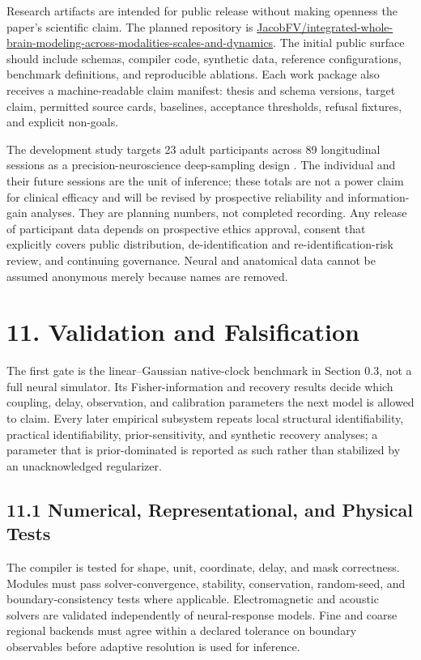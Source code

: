 Research artifacts are intended for public release without making openness
the paper's scientific claim. The planned repository is
\href{https://github.com/JacobFV/integrated-whole-brain-modeling-across-modalities-scales-and-dynamics}{JacobFV/integrated-whole-brain-modeling-across-modalities-scales-and-dynamics}.
The initial public surface should include schemas, compiler code, synthetic
data, reference configurations, benchmark definitions, and reproducible
ablations. Each work package also receives a machine-readable claim manifest:
thesis and schema versions, target claim, permitted source cards, baselines,
acceptance thresholds, refusal fixtures, and explicit non-goals.

The development study targets 23 adult participants across 89 longitudinal
sessions as a precision-neuroscience deep-sampling design
\citep{poldrack2015myconnectome,gordon2017msc}. The individual and their
future sessions are the unit of inference; these totals are not a power claim
for clinical efficacy and will be revised by prospective reliability and
information-gain analyses. They are planning numbers, not completed
recording. Any release of participant data depends on prospective ethics
approval, consent that explicitly covers public distribution, de-identification
and re-identification-risk review, and continuing governance. Neural and
anatomical data cannot be assumed anonymous merely because names are removed.

\section{11. Validation and Falsification}

The first gate is the linear--Gaussian native-clock benchmark in Section 0.3,
not a full neural simulator. Its Fisher-information and recovery results decide
which coupling, delay, observation, and calibration parameters the next model
is allowed to claim. Every later empirical subsystem repeats local structural
identifiability, practical identifiability, prior-sensitivity, and synthetic
recovery analyses; a parameter that is prior-dominated is reported as such
rather than stabilized by an unacknowledged regularizer.

\subsection{11.1 Numerical, Representational, and Physical Tests}

The compiler is tested for shape, unit, coordinate, delay, and mask
correctness. Modules must pass solver-convergence, stability, conservation,
random-seed, and boundary-consistency tests where applicable. Electromagnetic
and acoustic solvers are validated independently of neural-response models.
Fine and coarse regional backends must agree within a declared tolerance on
boundary observables before adaptive resolution is used for inference.

